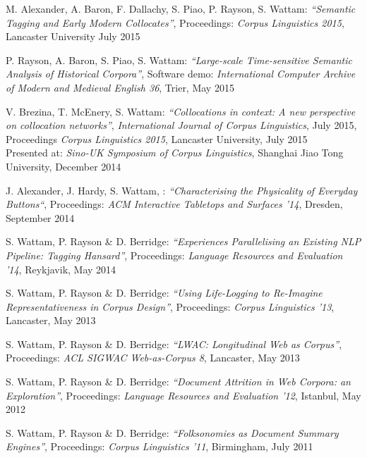 \documentclass{res}
\begin{document}
\begin{resume}


M. Alexander, A. Baron, F. Dallachy, S. Piao, P. Rayson, S. Wattam:
\textsl{``Semantic Tagging and Early Modern Collocates''},
Proceedings: {\it Corpus Linguistics 2015},
Lancaster University
July 2015

P. Rayson, A. Baron, S. Piao, S. Wattam:
\textsl{``Large-scale Time-sensitive Semantic Analysis of Historical Corpora''},
Software demo: {\it International Computer Archive of Modern and Medieval English 36},
Trier,
May 2015

V. Brezina, T. McEnery, S. Wattam:
\textsl{``Collocations in context: A new perspective on collocation networks''},
{\it International Journal of Corpus Linguistics},
July 2015,\\
Proceedings {\it Corpus Linguistics 2015},
Lancaster University, 
July 2015\\
Presented at: {\it Sino-UK Symposium of Corpus Linguistics},
Shanghai Jiao Tong University,
December 2014


J. Alexander, J. Hardy, S. Wattam, :
\textsl{``Characterising the Physicality of Everyday Buttons``},
Proceedings: {\it ACM Interactive Tabletops and Surfaces '14},
Dresden,
September 2014


S. Wattam, P. Rayson \& D. Berridge:
\textsl{``Experiences Parallelising an Existing NLP Pipeline: Tagging Hansard''},
Proceedings: {\it Language Resources and Evaluation '14},
Reykjavik,
May 2014


S. Wattam, P. Rayson \& D. Berridge:
\textsl{``Using Life-Logging to Re-Imagine Representativeness in Corpus Design''},
Proceedings: {\it Corpus Linguistics '13},
Lancaster,
May 2013


S. Wattam, P. Rayson \& D. Berridge:
\textsl{``LWAC: Longitudinal Web as Corpus''},
Proceedings: {\it ACL SIGWAC Web-as-Corpus 8},
Lancaster,
May 2013


S. Wattam, P. Rayson \& D. Berridge:
\textsl{``Document Attrition in Web Corpora: an Exploration''},
Proceedings: {\it Language Resources and Evaluation '12},
Istanbul,
May 2012


S. Wattam, P. Rayson \& D. Berridge:
\textsl{``Folksonomies as Document Summary Engines''},
Proceedings: {\it Corpus Linguistics '11},
Birmingham,
July 2011




\end{resume}
\end{document}

